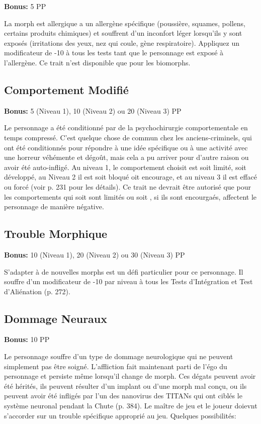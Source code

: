 \textbf{Bonus:} 5 PP 

La morph est allergique a un allergène spécifique (poussière, squames, pollens, certains produits chimiques) et souffrent d'un inconfort léger lorsqu'ils y sont exposés (irritations des yeux, nez qui coule, gène respiratoire). Appliquez un modificateur de -10 à tous les tests tant que le personnage est exposé à l'allergène. Ce trait n'est disponible que pour les biomorphs. 

\subsection{Comportement Modifié} \label{sec:traits-modified-behaviour} 

\textbf{Bonus:} 5 (Niveau 1), 10 (Niveau 2) ou 20 (Niveau 3) PP 

Le personnage a été conditionné par de la psychochirurgie comportementale en temps compressé. C'est quelque chose de commun chez les anciens-criminels, qui ont été conditionnés pour répondre à une idée spécifique ou à une activité avec une horreur véhémente et dégoût, mais cela a pu arriver pour d'autre raison ou avoir été auto-infligé. Au niveau 1, le comportement choisit est soit limité, soit développé, au Niveau 2 il est soit bloqué oit encourage, et au niveau 3 il est effacé ou forcé (voir p. 231 pour les détails). Ce trait ne devrait être autorisé que pour les comportements qui soit sont limités ou soit , si ils sont encourgaés, affectent le personnage de manière négative. 

\subsection{Trouble Morphique} \label{sec:traits-morphing-disorder} 

\textbf{Bonus:} 10 (Niveau 1), 20 (Niveau 2) ou 30 (Niveau 3) PP 

S'adapter à de nouvelles morphs est un défi particulier pour ce personnage. Il souffre d'un modificateur de -10 par niveau à tous les Tests d'Intégration et Test d'Aliénation (p. 272). 

\subsection{Dommage Neuraux} \label{sec:traits-neural-damage} 

\textbf{Bonus:} 10 PP 

Le personnage souffre d'un type de dommage neurologique qui ne peuvent simplement pas être soigné. L'affliction fait maintenant parti de l'égo du personnage et persiste même lorsqu'il change de morph. Ces dégats peuvent avoir été hérités, ils peuvent résulter d'un implant ou d'une morph mal conçu, ou ils peuvent avoir été infligés par l'un des nanovirus des TITANs qui ont ciblés le système neuronal pendant la Chute (p. 384). Le maître de jeu et le joueur doievnt s'accorder sur un trouble spécifique approprié au jeu. Quelques possibilités: 

